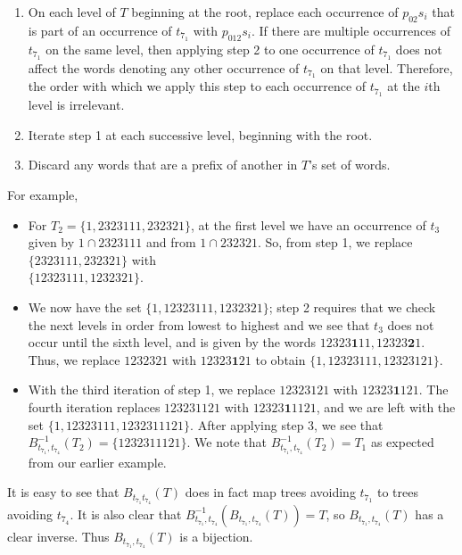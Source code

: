 \documentclass[12pt]{article}
\begin{document}
\begin{enumerate}
\item On each level of $T$ beginning at the root, replace each occurrence of $p_02s_i$ that is part of an occurrence of $t_{7_1}$ with $p_012s_i$. If there are multiple occurrences of $t_{7_1}$ on the same level, then applying step 2 to one occurrence of $t_{7_1}$ does not affect the words denoting any other occurrence of $t_{7_1}$ on that level. Therefore, the order with which we apply this step to each occurrence of $t_{7_1}$ at the $i$th level is irrelevant.
\item Iterate step 1 at each successive level, beginning with the root.
\item Discard any words that are a prefix of another in $T$'s set of words.
\end{enumerate}

For example, 
\begin{itemize}
\item For $T_2 = \{1,2323111,232321 \}$, at the first level we have an occurrence of $t_3$ given by $1 \cap 2323111$ and from $1 \cap 232321$. So, from step 1, we replace $\{2323111, 232321\}$ with \\$\{12323111, 1232321\}$.
\item We now have the set $\{1,12323111,1232321\}$; step 2 requires that we check the next levels in order from lowest to highest and we see that $t_3$ does not occur until the sixth level, and is given by the words $12323\textbf{1}11,12323\textbf{2}1$.  Thus, we replace $1232321$ with $12323\textbf{1}21$ to obtain $\{1,12323111,12323121\}$.
\item With the third iteration of step 1, we replace $12323121$ with $12323\textbf{1}121$.  The fourth iteration replaces $123231121$ with $12323\textbf{1}1121$, and we are left with the set $\{1, \allowbreak 12323111, \allowbreak 1232311121\}$. After applying step 3, we see that $B_{t_{7_1},t_{7_4}}^{-1}(T_2)=\{1232311121\}$. We note that $B_{t_{7_1},t_{7_4}}^{-1}(T_2)= T_1$ as expected from our earlier example. 
\end{itemize}

It is easy to see that $B_{t_{7_1}t_{7_4}}(T)$ does in fact map trees avoiding $t_{7_1}$ to trees avoiding $t_{7_4}$.  It is also clear that $B_{t_{7_1},t_{7_4}}^{-1}(B_{t_{7_1},t_{7_4}}(T))=T$, so $B_{t_{7_1},t_{7_4}}(T)$ has a clear inverse.  Thus $B_{t_{7_1},t_{7_4}}(T)$ is a bijection.
\end{document}

